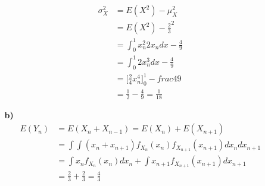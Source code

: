 \documentclass[a4paper,11pt]{article}
\begin{document}
\begin{enumerate}
\begin{enumerate}
			\begin{align*}
				\sigma_X^2 &= E(X^2) - \mu_X^2 \\
						   &= E(X^2) - \frac{2}{3}^2 \\
						   &= \int_0^1 x_n^2 2x_n dx - \frac{4}{9} \\
						   &= \int_0^1 2x_n^3 dx - \frac{4}{9} \\
						   &= \bigg[ \frac{2}{4} x_n^4 \bigg]_0^1 - frac{4}{9} \\
						   &= \frac{1}{2} - \frac{4}{9} = \frac{1}{18}
			\end{align*}

			\item[\textbf{b)}]
			\begin{align*}
				E(Y_n) &= E(X_n + X_{n - 1}) = E(X_n) + E(X_{n + 1}) \\
					   &= \int\int (x_n + x_{n + 1}) f_{X_n}(x_n) f_{X_{n + 1}}(x_{n + 1}) dx_n dx_{n + 1} \\
					   &= \int x_n f_{X_n}(x_n) dx_n + \int x_{n + 1} f_{X_{n + 1}}(x_{n + 1}) dx_{n + 1} \\
					   &= \frac{2}{3} + \frac{2}{3} = \frac{4}{3}
			\end{align*}
		\end{enumerate}
	\end{enumerate}
\end{document}
